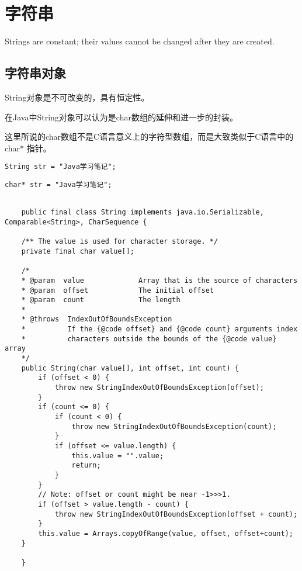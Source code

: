 \chapter{字符串}
\label{chap:string}

    Strings are constant; their values cannot be changed after they are created.

\section{字符串对象}

String对象是不可改变的，具有恒定性。

在Java中String对象可以认为是char数组的延伸和进一步的封装。

\begin{noteblock}
    这里所说的char数组不是C语言意义上的字符型数组，而是大致类似于C语言中的 char* 指针。 \par
    \begin{lstlisting}[style=cjava]
    String str = "Java学习笔记"; 
    \end{lstlisting}
    \begin{lstlisting}[style=cjava]
    char* str = "Java学习笔记";
    \end{lstlisting}
\end{noteblock}

\begin{lstlisting}[style=cjava]

    public final class String implements java.io.Serializable, Comparable<String>, CharSequence {

    /** The value is used for character storage. */
    private final char value[];

    /*
    * @param  value             Array that is the source of characters
    * @param  offset            The initial offset
    * @param  count             The length
    *
    * @throws  IndexOutOfBoundsException
    *          If the {@code offset} and {@code count} arguments index
    *          characters outside the bounds of the {@code value} array
    */
    public String(char value[], int offset, int count) {
        if (offset < 0) {
            throw new StringIndexOutOfBoundsException(offset);
        }
        if (count <= 0) {
            if (count < 0) {
                throw new StringIndexOutOfBoundsException(count);
            }
            if (offset <= value.length) {
                this.value = "".value;
                return;
            }
        }
        // Note: offset or count might be near -1>>>1.
        if (offset > value.length - count) {
            throw new StringIndexOutOfBoundsException(offset + count);
        }
        this.value = Arrays.copyOfRange(value, offset, offset+count);
    }

    }

\end{lstlisting}

